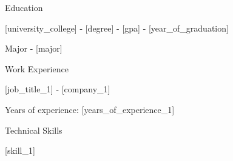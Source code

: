 \documentclass{direct}
\begin{document}
	\begin{rSection}{Education}
		\begin{desc}{[university\_college] - [degree] - [gpa] - [year\_of\_graduation]}
			\item{Major - [major]}
		\end{desc}
	\end{rSection}
	\begin{rSection}{Work Experience}
		\begin{desc}{[job\_title\_1] - [company\_1]}
			 \item {Years of experience: [years\_of\_experience\_1]}
		\end{desc}
	\end{rSection}
	\begin{rSection}{Technical Skills}
		\item{[skill\_1]}
	\end{rSection}
\end{document}

